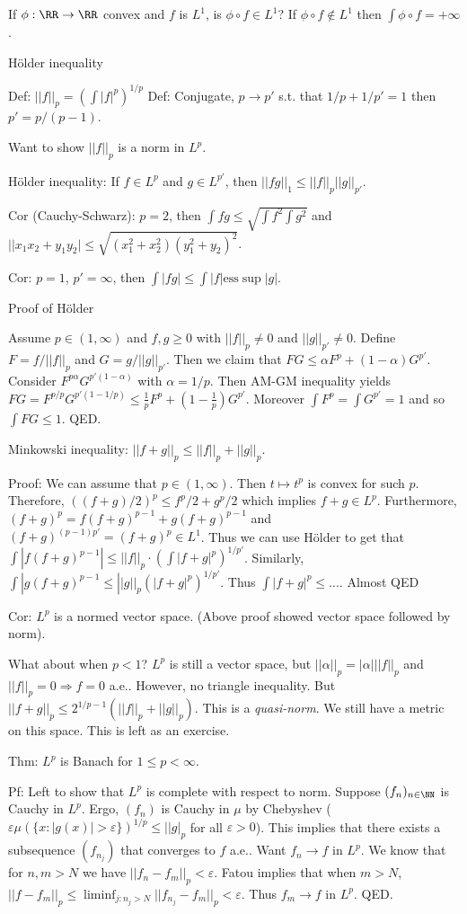 \documentclass{../uva7310}
\begin{document}
If $\phi:\RR\rightarrow\RR$ convex and $f$ is $L^1$, is $\phi\circ f\in L^1$? If $\phi\circ f\notin L^1$ then $\int \phi\circ f=+\infty$.

H\"older inequality

Def: $||f||_p=\left(\int|f|^p\right)^{1/p}$
Def: Conjugate, $p\to p'$ s.t. that $1/p+1/p'=1$ then $p'=p/(p-1)$.

Want to show $||f||_p$ is a norm in $L^p$.

H\"older inequality: If $f\in L^p$ and $g\in L^{p'}$, then $||fg||_1\leq ||f||_p||g||_{p'}$.

Cor (Cauchy-Schwarz): $p=2$, then $\int fg \leq \sqrt{\int f^2\int g^2}$ and $||x_1x_2+y_1y_2|\leq \sqrt{(x_1^2+x_2^2)(y_1^2+y_2)^2}$.

Cor: $p=1$, $p'=\infty$, then $\int |fg|\leq \int |f|\text{ess}\sup |g|$.

Proof of H\"older

Assume $p\in(1,\infty)$ and $f,g\geq 0$ with $||f||_p\neq 0$ and $||g||_{p'}\neq 0$. Define $F=f/||f||_p$ and $G=g/||g||_{p'}$.
Then we claim that $FG\leq \alpha F^p+(1-\alpha) G^{p'}$. Consider $F^{p\alpha}G^{p'(1-\alpha)}$ with $\alpha=1/p$. Then
AM-GM inequality yields $FG=F^{p/p}G^{p'(1-1/p)}\leq \frac{1}{p}F^p+(1-\frac{1}{p}) G^{p'}$.
Moreover $\int F^p=\int G^{p'}=1$ and so $\int FG\leq 1$. QED.

Minkowski inequality: $||f+g||_p\leq ||f||_p+||g||_p$.

Proof: We can assume that $p\in(1,\infty)$. Then $t\mapsto t^p$ is convex for such $p$. Therefore, $((f+g)/2)^p\leq f^p/2+g^p/2$
which implies $f+g\in L^p$. Furthermore, $(f+g)^p=f(f+g)^{p-1}+g(f+g)^{p-1}$ and $(f+g)^{(p-1)p'}=(f+g)^p\in L^1$. Thus we can
use H\"older to get that $\int |f(f+g)^{p-1}|\leq ||f||_p \cdot \left(\int|f+g|^p\right)^{1/p'}$. Similarly,
$\int|g(f+g)^{p-1}\leq ||g||_p\left(|f+g|^p\right)^{1/p'}$. Thus $\int |f+g|^p\leq ...$. Almost QED

Cor: $L^p$ is a normed vector space. (Above proof showed vector space followed by norm).

What about when $p<1$? $L^p$ is still a vector space, but $||\alpha||_p=|\alpha|||f||_p$ and $||f||_p=0\Rightarrow f=0$ a.e..
However, no triangle inequality. But $||f+g||_p\leq 2^{1/p-1} (||f||_p+||g||_p)$. This is a \textit{quasi-norm}.
We still have a metric on this space. This is left as an exercise.

Thm: $L^p$ is Banach for $1\leq p< \infty$.

Pf: Left to show that $L^p$ is complete with respect to norm. Suppose $(f_n)_{n\in\NN}$ is Cauchy in $L^p$. Ergo,
$(f_n)$ is Cauchy in $\mu$ by Chebyshev ($\varepsilon \mu(\{x:|g(x)|>\varepsilon\})^{1/p}\leq ||g|_p$ for all $\varepsilon>0$).
This implies that there exists a subsequence $(f_{n_j})$ that converges to $f$ a.e.. Want $f_n\to f$ in $L^p$.
We know that for $n,m>N$ we have $||f_n-f_m||_p<\varepsilon$. Fatou implies that when $m>N$,
$||f-f_m||_p \leq \liminf_{j:n_j>N} ||f_{n_j}-f_m||_p<\varepsilon$. Thus $f_m\to f$ in $L^p$. QED.
\end{document}

